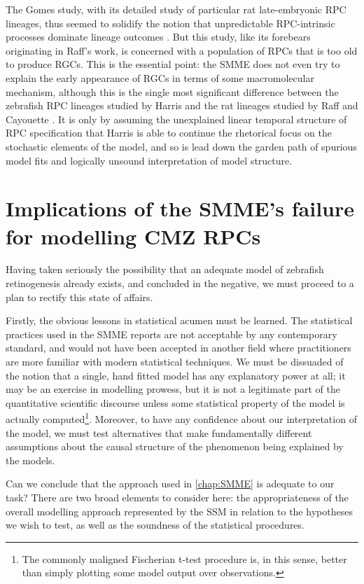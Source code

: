 The Gomes study, with its detailed study of particular rat late-embryonic RPC lineages, thus seemed to solidify the notion that unpredictable RPC-intrinsic processes dominate lineage outcomes \cite{Gomes2011}. But this study, like its forebears originating in Raff's work, is concerned with a population of RPCs that is too old to produce RGCs. This is the essential point: the SMME does not even try to explain the early appearance of RGCs in terms of some macromolecular mechanism, although this is the single most significant difference between the zebrafish RPC lineages studied by Harris and the rat lineages studied by Raff and Cayouette \cite{Cayouette2003, Gomes2011}. It is only by assuming the unexplained linear temporal structure of RPC specification that Harris is able to continue the rhetorical focus on the stochastic elements of the model, and so is lead down the garden path of spurious model fits and logically unsound interpretation of model structure.

\section{Implications of the SMME's failure for modelling CMZ RPCs}
Having taken seriously the possibility that an adequate model of zebrafish retinogenesis already exists, and concluded in the negative, we must proceed to a plan to rectify this state of affairs.

Firstly, the obvious lessons in statistical acumen must be learned. The statistical practices used in the SMME reports are not acceptable by any contemporary standard, and would not have been accepted in another field where practitioners are more familiar with modern statistical techniques. We must be dissuaded of the notion that a single, hand fitted model has any explanatory power at all; it may be an exercise in modelling prowess, but it is not a legitimate part of the quantitative scientific discourse unless some statistical property of the model is actually computed\footnote{The commonly maligned Fischerian t-test procedure \cite[pp.181]{HOIJTINK2008} is, in this sense, better than simply plotting some model output over observations.}. Moreover, to have any confidence about our interpretation of the model, we must test alternatives that make fundamentally different assumptions about the causal structure of the phenomenon being explained by the models.

Can we conclude that the approach used in \autoref{chap:SMME} is adequate to our task? There are two broad elements to consider here: the appropriateness of the overall modelling approach represented by the SSM in relation to the hypotheses we wish to test, as well as the soundness of the statistical procedures.

